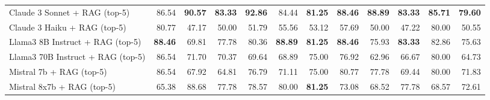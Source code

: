 \begin{table}[H]
{\begin{tabular}{lrrrrrrrrrrr}
\rowcolor{Gray}
Claude 3 Sonnet + RAG (top-5) & 86.54 & \textbf{90.57} & \textbf{83.33} & \textbf{92.86} & 84.44 & \textbf{81.25} & \textbf{88.46} & \textbf{88.89} & \textbf{83.33} & \textbf{85.71} & \textbf{79.60} \\
\rowcolor{Gray}
Claude 3 Haiku + RAG (top-5) & 80.77 & 47.17 & 50.00 & 51.79 & 55.56 & 53.12 & 57.69 & 50.00 & 47.22 & 80.00 & 50.55 \\
\rowcolor{Gray}
Llama3 8B Instruct + RAG (top-5) & \textbf{88.46} & 69.81 & 77.78 & 80.36 & \textbf{88.89} & \textbf{81.25} & \textbf{88.46} & 75.93 & \textbf{83.33} & 82.86 & 75.63 \\
\rowcolor{Gray}
Llama3 70B Instruct + RAG (top-5) & 86.54 & 71.70 & 70.37 & 69.64 & 68.89 & 75.00 & 76.92 & 62.96 & 66.67 & 80.00 & 64.73 \\
\rowcolor{Gray}
Mistral 7b + RAG (top-5) & 86.54 & 67.92 & 64.81 & 76.79 & 71.11 & 75.00 & 80.77 & 77.78 & 69.44 & 80.00 & 71.83 \\
\rowcolor{Gray}
Mistral 8x7b + RAG (top-5) & 65.38 & 88.68 & 77.78 & 78.57 & 80.00 & \textbf{81.25} & 73.08 & 68.52 & 77.78 & 68.57 & 72.61 \\
\bottomrule
\end{tabular}
}
 \label{tab:implicit_persona_20topics_10}
\end{table}


